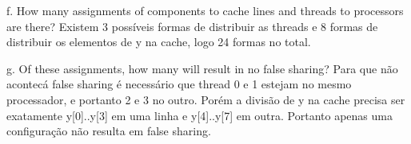 f. How many assignments of components to cache lines and threads to processors are there?
Existem 3 possíveis formas de distribuir as threads e 8 formas de distribuir os elementos de y na cache, logo 24 formas no total.

g. Of these assignments, how many will result in no false sharing? Para que não acontecá false sharing é necessário que thread 0 e 1 estejam no mesmo processador, e portanto 2 e 3 no outro. Porém a divisão de y na cache precisa ser exatamente y[0]..y[3] em uma linha e y[4]..y[7] em outra. Portanto apenas uma configuração não resulta em false sharing.
